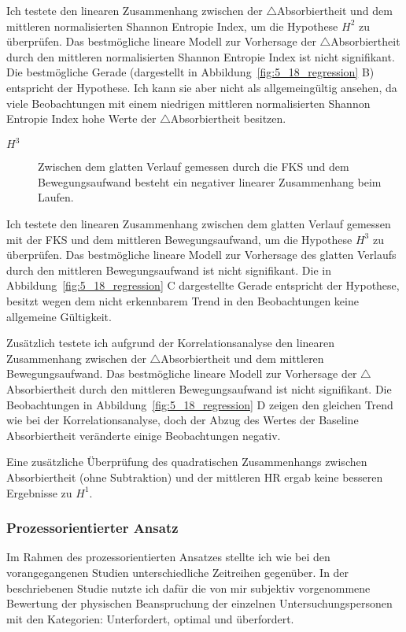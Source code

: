 Ich testete den linearen Zusammenhang zwischen der $\bigtriangleup$Absorbiertheit
und dem mittleren normalisierten Shannon Entropie Index, um die Hypothese $H^2$ zu überprüfen. Das bestmögliche lineare Modell zur Vorhersage der $\bigtriangleup$Absorbiertheit durch den mittleren normalisierten Shannon Entropie Index ist nicht signifikant. Die bestmögliche Gerade (dargestellt in Abbildung~\ref{fig:5_18_regression} B) entspricht der Hypothese. Ich kann sie aber nicht als allgemeingültig ansehen, da viele Beobachtungen mit einem niedrigen mittleren normalisierten Shannon Entropie Index hohe Werte der $\bigtriangleup$Absorbiertheit besitzen.

\begin{description}
	\item[$H^3$] Zwischen dem glatten Verlauf gemessen durch die \ac{FKS} und dem Bewegungsaufwand besteht ein negativer linearer Zusammenhang beim Laufen.
\end{description}

Ich testete den linearen Zusammenhang zwischen dem glatten Verlauf gemessen mit der \ac{FKS} und dem mittleren Bewegungsaufwand, um die Hypothese $H^3$ zu überprüfen. Das bestmögliche lineare Modell zur Vorhersage des glatten Verlaufs durch den mittleren Bewegungsaufwand ist nicht signifikant. Die in Abbildung~\ref{fig:5_18_regression} C dargestellte Gerade entspricht der Hypothese, besitzt wegen dem nicht erkennbarem Trend in den Beobachtungen keine allgemeine Gültigkeit.

Zusätzlich testete ich aufgrund der Korrelationsanalyse den linearen Zusammenhang zwischen der $\bigtriangleup$Absorbiertheit und dem mittleren Bewegungsaufwand. Das bestmögliche lineare Modell zur Vorhersage der $\bigtriangleup$Absorbiertheit durch den mittleren Bewegungsaufwand ist nicht signifikant. Die Beobachtungen in Abbildung~\ref{fig:5_18_regression} D zeigen den gleichen Trend wie bei der Korrelationsanalyse, doch der Abzug des Wertes der Baseline Absorbiertheit veränderte einige Beobachtungen negativ.

Eine zusätzliche Überprüfung des quadratischen Zusammenhangs zwischen Absorbiertheit (ohne Subtraktion) und der mittleren \ac{HR} ergab keine besseren Ergebnisse zu $H^1$.

\subsubsection{Prozessorientierter Ansatz}
Im Rahmen des prozessorientierten Ansatzes stellte ich wie bei den vorangegangenen Studien unterschiedliche Zeitreihen gegenüber. In der beschriebenen Studie nutzte ich dafür die von mir subjektiv vorgenommene Bewertung der physischen Beanspruchung der einzelnen Untersuchungspersonen mit den Kategorien: Unterfordert, optimal und überfordert.

